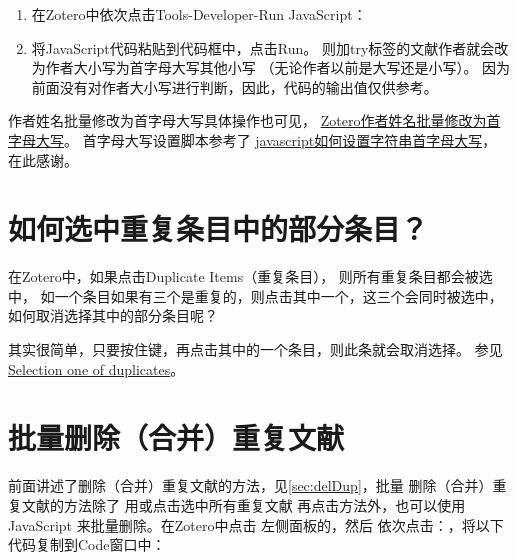 \documentclass[theorem=false,mathfont=none,openany,sub3section]{easybook}
\begin{document}
{\begin{enumerate}
\begin{lstlisting}[language=JavaScript]
				let newCreators = [];
				for (let creator of creators) {
					creator.firstName = titleCase(creator.firstName.trim());
					creator.lastName = titleCase(creator.lastName.trim());
					creator.fieldMode = newFieldMode;
					newCreators.push(creator);
				} 
				item.setCreators(newCreators);
				await item.save();
			}  
			
		}); 
		return ids.length + "个条目作者变为作者首字母大写。";
		
		
		function titleCase(str) {    var newStr = str.split(" ");    for(var i = 0; i<newStr.length; i++){
				newStr[i] = newStr[i].slice(0,1).toUpperCase() + newStr[i].slice(1).toLowerCase();
			}    return newStr.join(" ");
		}
	\end{lstlisting}
	
	\item 在Zotero中依次点击Tools-Developer-Run JavaScript：
	\item 将JavaScript代码粘贴到代码框中，点击Run。
	则加try标签的文献作者就会改为作者大小写为首字母大写其他小写
	（无论作者以前是大写还是小写）。
	因为前面没有对作者大小写进行判断，因此，代码的输出值仅供参考。
\end{enumerate}


作者姓名批量修改为首字母大写具体操作也可见，
\href{https://zhuanlan.zhihu.com/p/354481222}
{Zotero作者姓名批量修改为首字母大写}。
首字母大写设置脚本参考了
\href{https://blog.csdn.net/dongjt_china/article/details/107283450#:~:text=%E5%9C%A8javascr,%EF%BC%8C%E5%85%B6%E4%BD%99%E9%83%A8%E5%88%86%E5%B0%8F%E5%86%99%E3%80%82}
{javascript如何设置字符串首字母大写}，
在此感谢。

\section{如何选中重复条目中的部分条目？}\label{sec:selectDup}	
在Zotero中，如果点击Duplicate Items（重复条目），
则所有重复条目都会被选中，
如一个条目如果有三个是重复的，则点击其中一个，这三个会同时被选中，
如何取消选择其中的部分条目呢？

其实很简单，只要按住键，再点击其中的一个条目，则此条就会取消选择。
参见\href{https://forums.zotero.org/discussion/91561/selection-one-of-duplicates}{Selection one of duplicates}。

\section{批量删除（合并）重复文献}\label{sec:DelDupBatch}				
前面讲述了删除（合并）重复文献的方法，见\cref{sec:delDup}，批量
删除（合并）重复文献的方法除了
用或点击选中所有重复文献
再点击方法外，也可以使用JavaScript
来批量删除。在Zotero中点击
左侧面板的，然后
依次点击：，将以下代码复制到Code窗口中：

}
\end{document}
